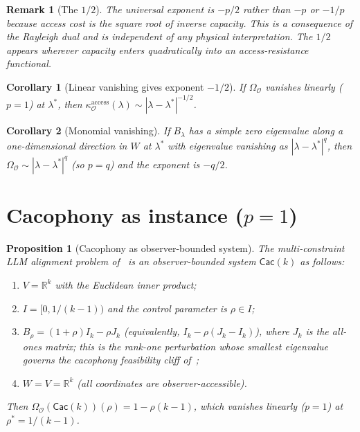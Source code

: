 \documentclass[11pt]{article}
\newtheorem{proposition}{Proposition}
\newtheorem{corollary}{Corollary}
\newtheorem{remark}{Remark}
\newcommand{\Obs}{\mathcal{O}}
\newcommand{\OmegaO}{\Omega_{\Obs}}
\newcommand{\kappaO}{\kappa_{\Obs}}
\newcommand{\Real}{\mathbb{R}}
\newcommand{\Cacph}{\mathsf{Cac}}
\begin{document}
\begin{remark}[The $1/2$]
The universal exponent is $-p/2$ rather than $-p$ or $-1/p$
because \emph{access cost is the square root of inverse
capacity}. This is a consequence of the Rayleigh dual and is
independent of any physical interpretation. The $1/2$ appears
wherever capacity enters quadratically into an access-resistance
functional.
\end{remark}

\begin{corollary}[Linear vanishing gives exponent $-1/2$]
\label{cor:linear}
If $\OmegaO$ vanishes linearly ($p = 1$) at $\lambda^*$, then
$\kappaO^{\mathrm{access}}(\lambda) \sim |\lambda - \lambda^*|^{-1/2}$.
\end{corollary}

\begin{corollary}[Monomial vanishing]
\label{cor:monomial}
If $B_\lambda$ has a simple zero eigenvalue along a one-dimensional
direction in $W$ at $\lambda^*$ with eigenvalue vanishing as
$|\lambda - \lambda^*|^q$, then $\OmegaO \sim |\lambda - \lambda^*|^q$
(so $p = q$) and the exponent is $-q/2$.
\end{corollary}

\section{Cacophony as instance ($p = 1$)}
\label{sec:cacophony}

\begin{proposition}[Cacophony as observer-bounded system]
\label{prop:cac}
The multi-constraint LLM alignment problem of~\cite{tiffany2026cacophony}
is an observer-bounded system $\Cacph(k)$ as follows:
\begin{enumerate}[label=(\roman*),leftmargin=*,itemsep=2pt]
\item $V = \Real^k$ with the Euclidean inner product;
\item $I = [0, 1/(k-1))$ and the control parameter is $\rho \in I$;
\item $B_\rho = (1+\rho) I_k - \rho J_k$ (equivalently,
$I_k - \rho(J_k - I_k)$), where $J_k$ is the all-ones matrix;
this is the rank-one perturbation whose smallest eigenvalue
governs the cacophony feasibility cliff of~\cite{tiffany2026cacophony};
\item $W = V = \Real^k$ (all coordinates are observer-accessible).
\end{enumerate}
Then $\OmegaO(\Cacph(k))(\rho) = 1 - \rho(k-1)$, which vanishes
linearly ($p = 1$) at $\rho^* = 1/(k-1)$.
\end{proposition}
\end{document}
